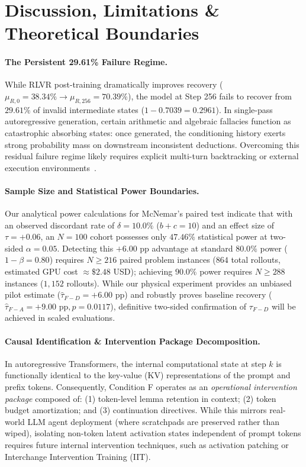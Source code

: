 \documentclass[11pt]{article}
\begin{document}
\section{Discussion, Limitations \& Theoretical Boundaries}

\paragraph{The Persistent 29.61\% Failure Regime.}
While RLVR post-training dramatically improves recovery ($\mu_{R,0}=38.34\% \to \mu_{R,256}=70.39\%$), the model at Step 256 fails to recover from $29.61\%$ of invalid intermediate states ($1 - 0.7039 = 0.2961$). In single-pass autoregressive generation, certain arithmetic and algebraic fallacies function as catastrophic absorbing states: once generated, the conditioning history exerts strong probability mass on downstream inconsistent deductions. Overcoming this residual failure regime likely requires explicit multi-turn backtracking or external execution environments~\cite{Kumar2024Training}.

\paragraph{Sample Size and Statistical Power Boundaries.}
Our analytical power calculations for McNemar's paired test indicate that with an observed discordant rate of $\delta = 10.0\%$ ($b+c=10$) and an effect size of $\tau = +0.06$, an $N=100$ cohort possesses only $47.46\%$ statistical power at two-sided $\alpha = 0.05$. Detecting this $+6.00\text{ pp}$ advantage at standard $80.0\%$ power ($1 - \beta = 0.80$) requires $N \ge 216$ paired problem instances ($864$ total rollouts, estimated GPU cost $\approx \$2.48$ USD); achieving $90.0\%$ power requires $N \ge 288$ instances ($1,152$ rollouts). While our physical experiment provides an unbiased pilot estimate ($\hat{\tau}_{F-D} = +6.00\text{ pp}$) and robustly proves baseline recovery ($\hat{\tau}_{F-A} = +9.00\text{ pp}, p = 0.0117$), definitive two-sided confirmation of $\tau_{F-D}$ will be achieved in scaled evaluations.

\paragraph{Causal Identification \& Intervention Package Decomposition.}
In autoregressive Transformers, the internal computational state at step $k$ is functionally identical to the key-value (KV) representations of the prompt and prefix tokens. Consequently, Condition F operates as an \emph{operational intervention package} composed of: (1) token-level lemma retention in context; (2) token budget amortization; and (3) continuation directives. While this mirrors real-world LLM agent deployment (where scratchpads are preserved rather than wiped), isolating non-token latent activation states independent of prompt tokens requires future internal intervention techniques, such as activation patching or Interchange Intervention Training (IIT).
\end{document}
